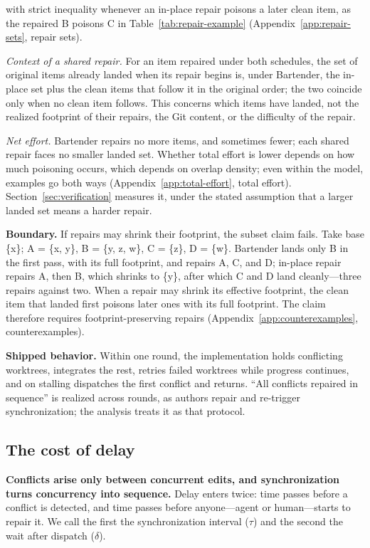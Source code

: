 \documentclass[pdflatex,sn-mathphys-ay]{sn-jnl}
\theoremstyle{thmstyleone}
\theoremstyle{thmstylethree}
\begin{document}
with strict inequality whenever an in-place repair poisons a later clean item, as the repaired B poisons C in Table~\ref{tab:repair-example} (Appendix~\ref{app:repair-sets}, repair sets).

\emph{Context of a shared repair.} For an item repaired under both schedules, the set of original items already landed when its repair begins is, under Bartender, the in-place set plus the clean items that follow it in the original order; the two coincide only when no clean item follows. This concerns which items have landed, not the realized footprint of their repairs, the Git content, or the difficulty of the repair.

\emph{Net effort.} Bartender repairs no more items, and sometimes fewer; each shared repair faces no smaller landed set. Whether total effort is lower depends on how much poisoning occurs, which depends on overlap density; even within the model, examples go both ways (Appendix~\ref{app:total-effort}, total effort). Section~\ref{sec:verification} measures it, under the stated assumption that a larger landed set means a harder repair.

\textbf{Boundary.} If repairs may shrink their footprint, the subset claim fails. Take base \{x\}; A = \{x, y\}, B = \{y, z, w\}, C = \{z\}, D = \{w\}. Bartender lands only B in the first pass, with its full footprint, and repairs A, C, and D; in-place repair repairs A, then B, which shrinks to \{y\}, after which C and D land cleanly---three repairs against two. When a repair may shrink its effective footprint, the clean item that landed first poisons later ones with its full footprint. The claim therefore requires footprint-preserving repairs (Appendix~\ref{app:counterexamples}, counterexamples).

\textbf{Shipped behavior.} Within one round, the implementation holds conflicting worktrees, integrates the rest, retries failed worktrees while progress continues, and on stalling dispatches the first conflict and returns. ``All conflicts repaired in sequence'' is realized across rounds, as authors repair and re-trigger synchronization; the analysis treats it as that protocol.

\subsection{The cost of delay}\label{sec:delay}

\textbf{Conflicts arise only between concurrent edits, and synchronization turns concurrency into sequence.} Delay enters twice: time passes before a conflict is detected, and time passes before anyone---agent or human---starts to repair it. We call the first the synchronization interval (\(\tau\)) and the second the wait after dispatch (\(\delta\)).
\end{document}
